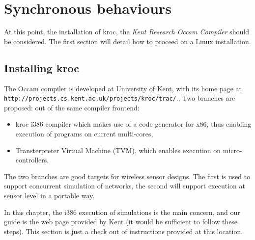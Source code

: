 \documentclass[times]{book}
\begin{document}
\chapter {Synchronous behaviours}

At this point, the installation of kroc, the {\sl Kent Research Occam Compiler}
should be considered. The first section will detail how to proceed on a Linux
installation.

\section{Installing kroc}

The Occam compiler is developed at University of Kent, with its home page at
{\tt http://projects.cs.kent.ac.uk/projects/kroc/trac/}.. Two branches are proposed:
out of the same compiler frontend:
\begin{itemize}
\item kroc i386 compiler which makes use of a code generator for x86, thus enabling execution
of programs on current multi-cores,
\item Transterpreter Virtual Machine (TVM), which enables execution on micro-controllers.
\end{itemize}

The two branches are good targets for wireless sensor designs. The first is used
to support concurrent simulation of networks, the second will support execution 
at sensor level in a portable way.

In this chapter, the i386 execution of simulations is the main concern, and our guide 
is the web page provided by Kent (it would be sufficient to follow these steps).
This section is just a check out of instructions provided at this location.
\end{document}

